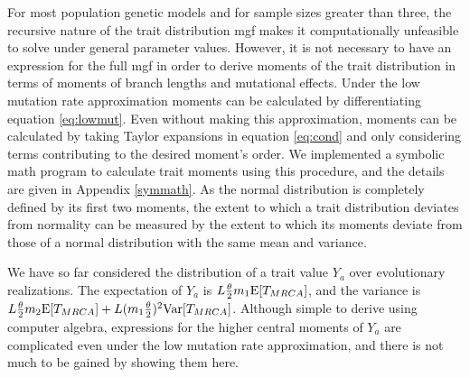 \newcommand{\AAA}{\E[\mathbbm{T}_{4,4}] + \frac{1}{3}\E[\mathbbm{T}_{3,4}] + \frac{2}{9}\E[\mathbbm{T}_{2,4}]}
\newcommand{\BBB}{\frac{1}{9}\E[\mathbbm{T}_{2,4}] + \frac{1}{6}\E[\mathbbm{T}_{3,4}]}
\newcommand{\CCC}{\E[\mathbbm{T}_{4,4}] - \frac{1}{6}\E[\mathbbm{T}_{3,4}] - \frac{1}{9}\E[\mathbbm{T}_{2,4}]}

For most population genetic models and for sample sizes greater than three, the
recursive nature of the trait distribution mgf makes it computationally
unfeasible to solve under general parameter values. However, it is not necessary
to have an expression for the full mgf in order to derive moments of the trait
distribution in terms of moments of branch lengths and mutational effects. Under
the low mutation rate approximation moments can be calculated by differentiating
equation \eqref{eq:lowmut}. Even without making this approximation, moments can
be calculated by taking Taylor expansions in equation \eqref{eq:cond} and only
considering terms contributing to the desired moment's order. We implemented a
symbolic math program to calculate trait moments using this procedure, and the
details are given in Appendix \ref{symmath}. As the normal distribution is
completely defined by its first two moments, the extent to which a trait
distribution deviates from normality can be measured by the extent to which its
moments deviate from those of a normal distribution with the same mean and
variance.

We have so far considered the distribution of a trait value $Y_a$ over
evolutionary realizations. The expectation of $Y_a$ is $L \frac{\theta}{2} m_1 \mathrm{E}[T_{MRCA}]$,
and the variance is $L \frac{\theta}{2} m_2 \mathrm{E}[T_{MRCA}] + L(m_1\frac{\theta}{2})^2\mathrm{Var}[T_{MRCA}]$. Although
simple to derive using computer algebra, expressions for the higher central
moments of $Y_a$ are complicated even under the low mutation rate approximation,
and there is not much to be gained by showing them here.

